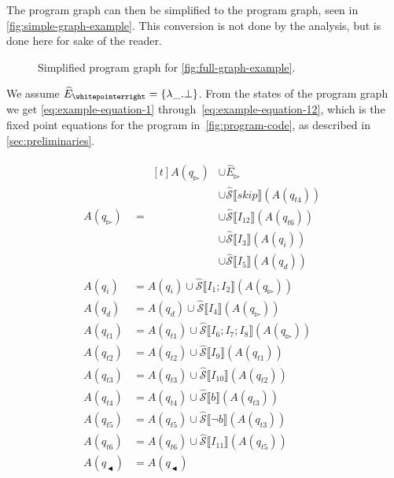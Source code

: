 The program graph can then be simplified to the program graph, seen in \autoref{fig:simple-graph-example}.
This conversion is not done by the analysis, but is done here for sake of the reader.

\begin{figure}
    \centering
    
    \caption{Simplified program graph for \autoref{fig:full-graph-example}.}
    \label{fig:simple-graph-example}
\end{figure}

We assume $\ab E_\whitepointerright=\{\lambda \_ .\bot\}$.
From the states of the program graph we get \autoref{eq:example-equation-1} through~\autoref{eq:example-equation-12}, which is the fixed point equations for the program in~\autoref{fig:program-code}, as described in \autoref{sec:preliminaries}.



\begin{align}
    A(q_\whitepointerright) &= \begin{aligned}[t]
    A(q_\whitepointerright) &\cup \hat E_\whitepointerright \\
                            &\cup \mathcal{\hat S} \lBrack skip \rBrack(A(q_{t4})) \\
                            &\cup \mathcal{\hat S} \lBrack I_{12} \rBrack (A(q_{t6})) \\
                            &\cup \mathcal{\hat S} \lBrack I_3 \rBrack (A(q_i)) \\
                            &\cup \mathcal{\hat S} \lBrack I_5 \rBrack (A(q_d))
    \end{aligned} \label{eq:example-equation-1} \\
    A(q_i) &= A(q_i) \cup \mathcal{\hat S} \lBrack I_1;I_2 \rBrack (A(q_\whitepointerright )) \\
    A(q_d) &= A(q_d) \cup \mathcal{\hat S} \lBrack I_4 \rBrack (A(q_\whitepointerright )) \\
    A(q_{t1}) &= A(q_{t1}) \cup \mathcal{\hat S} \lBrack I_6;I_7;I_8 \rBrack (A(q_\whitepointerright)) \\
    A(q_{t2}) &= A(q_{t2}) \cup \mathcal{\hat S} \lBrack I_9 \rBrack (A(q_{t1}))\\
    A(q_{t3}) &= A(q_{t3}) \cup \mathcal{\hat S} \lBrack I_{10} \rBrack (A(q_{t2}))\\
    A(q_{t4}) &= A(q_{t4}) \cup \mathcal{\hat S} \lBrack b \rBrack (A(q_{t3}))\\
    A(q_{t5}) &= A(q_{t5}) \cup \mathcal{\hat S} \lBrack \neg b \rBrack (A(q_{t3}))\\
    A(q_{t6}) &= A(q_{t6}) \cup \mathcal{\hat S} \lBrack I_{11} \rBrack (A(q_{t5}))\\
    A(q_\blackpointerleft) &= A(q_\blackpointerleft) \label{eq:example-equation-12}
\end{align}

